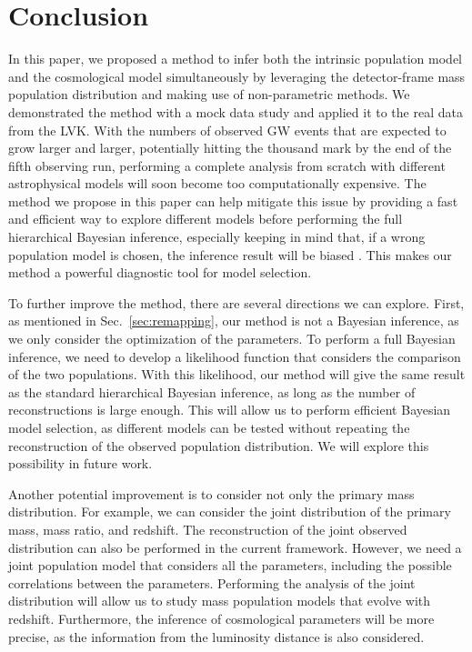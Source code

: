 \documentclass[sn-aps, pdflatex, iicol]{sn-jnl}
\begin{document}
\section{Conclusion}
\label{sec:conclusion}

In this paper, we proposed a method to infer both the intrinsic population model and the cosmological model simultaneously by leveraging the detector-frame mass population distribution and making use of non-parametric methods.
We demonstrated the method with a mock data study and applied it to the real data from the \ac{LVK}.
With the numbers of observed \ac{GW} events that are expected to grow larger and larger, potentially hitting the thousand mark by the end of the fifth observing run, performing a complete analysis from scratch with different astrophysical models will soon become too computationally expensive.
The method we propose in this paper can help mitigate this issue by providing a fast and efficient way to explore different models before performing the full hierarchical Bayesian inference, especially keeping in mind that, if a wrong population model is chosen, the inference result will be biased \citep{Mukherjee:2021rtw, Mastrogiovanni:2021wsd, Pierra:2023deu, LIGOScientific:2020kqk, KAGRA:2021duu, LIGOScientific:2021aug}.
This makes our method a powerful diagnostic tool for model selection.

To further improve the method, there are several directions we can explore.
First, as mentioned in Sec.~\ref{sec:remapping}, our method is not a Bayesian inference, as we only consider the optimization of the parameters.
To perform a full Bayesian inference, we need to develop a likelihood function that considers the comparison of the two populations.
With this likelihood, our method will give the same result as the standard hierarchical Bayesian inference, as long as the number of reconstructions is large enough.
This will allow us to perform efficient Bayesian model selection, as different models can be tested without repeating the reconstruction of the observed population distribution.
We will explore this possibility in future work.

Another potential improvement is to consider not only the primary mass distribution.
For example, we can consider the joint distribution of the primary mass, mass ratio, and redshift.
The reconstruction of the joint observed distribution can also be performed in the current framework.
However, we need a joint population model that considers all the parameters, including the possible correlations between the parameters.
Performing the analysis of the joint distribution will allow us to study mass population models that evolve with redshift.
Furthermore, the inference of cosmological parameters will be more precise, as the information from the luminosity distance is also considered.
\end{document}
